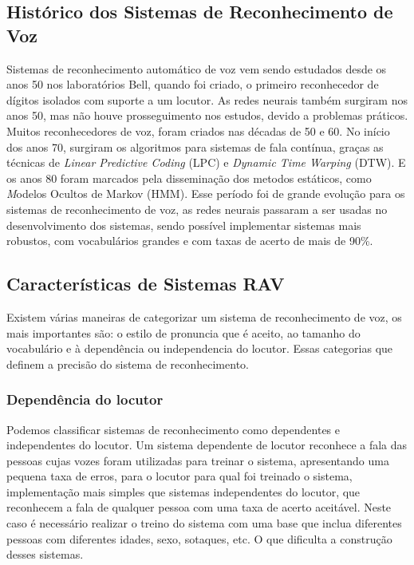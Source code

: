 \subsection{Histórico dos Sistemas de Reconhecimento de Voz}\label{sec:red_khn}

Sistemas de reconhecimento automático de voz vem sendo estudados desde os anos 50 nos laboratórios Bell, quando foi criado, o primeiro reconhecedor de dígitos isolados com suporte a um locutor.\cite{Historico1} As redes neurais também surgiram nos anos 50, mas não houve prosseguimento nos estudos, devido a problemas práticos. Muitos reconhecedores de voz, foram criados nas décadas de 50 e 60.\cite{RavSpeechSadaoki} No início dos anos 70, surgiram os algoritmos para sistemas de fala contínua, graças as técnicas de \textit{Linear Predictive Coding} (LPC) e \textit{Dynamic Time Warping} (DTW). \cite{FundamentRabiner} E os anos 80 foram marcados pela disseminação dos metodos estáticos, como \textit Modelos Ocultos de Markov (HMM). \cite{FundamentRabiner} Esse período foi de grande evolução para os sistemas de reconhecimento de voz, as redes neurais passaram a ser usadas no desenvolvimento dos sistemas, sendo possível implementar sistemas mais robustos, com vocabulários grandes e com taxas de acerto de mais de 90{\%}.\cite{AvaliaTecJose} 

\subsection{Características de Sistemas RAV}\label{sec:red_neu}

Existem várias maneiras de categorizar um sistema de reconhecimento de voz, os mais importantes são: o estilo de pronuncia que é aceito, ao tamanho do vocabulário e à dependência ou independencia do locutor. \cite{Carac1} Essas categorias que definem a precisão do sistema de reconhecimento.

\subsubsection{Dependência do locutor}
Podemos classificar sistemas de reconhecimento como dependentes e independentes do locutor. Um sistema dependente de locutor reconhece a fala das pessoas cujas vozes foram utilizadas para treinar o sistema, apresentando uma pequena taxa de erros, para o locutor para qual foi treinado o sistema,  implementação mais simples que sistemas independentes do locutor, que reconhecem a fala de qualquer pessoa com uma taxa de acerto aceitável. Neste caso é necessário realizar o treino do sistema com uma base que inclua diferentes pessoas com diferentes idades, sexo, sotaques, etc. O que dificulta a construção desses sistemas.

